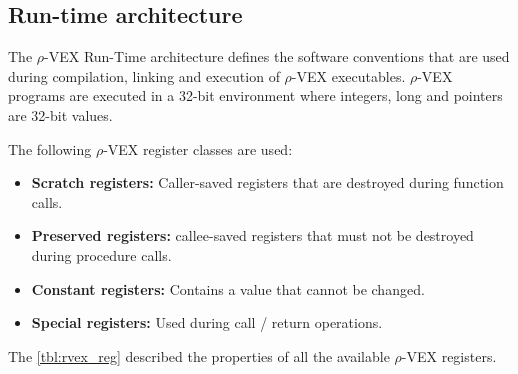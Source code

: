 \subsection{Run-time architecture}
The $\rho$-VEX Run-Time architecture defines the software conventions that are used during compilation, linking and execution of $\rho$-VEX executables. $\rho$-VEX programs are executed in a 32-bit environment where integers, long and pointers are 32-bit values. 

The following $\rho$-VEX register classes are used:
\begin{itemize}
  \item \textbf{Scratch registers:} Caller-saved registers that are destroyed during function calls.
  \item \textbf{Preserved registers:} callee-saved registers that must not be destroyed during procedure calls.
  \item \textbf{Constant registers:} Contains a value that cannot be changed.
  \item \textbf{Special registers:} Used during call / return operations.
\end{itemize}

The \ref{tbl:rvex_reg} described the properties of all the available $\rho$-VEX registers.

